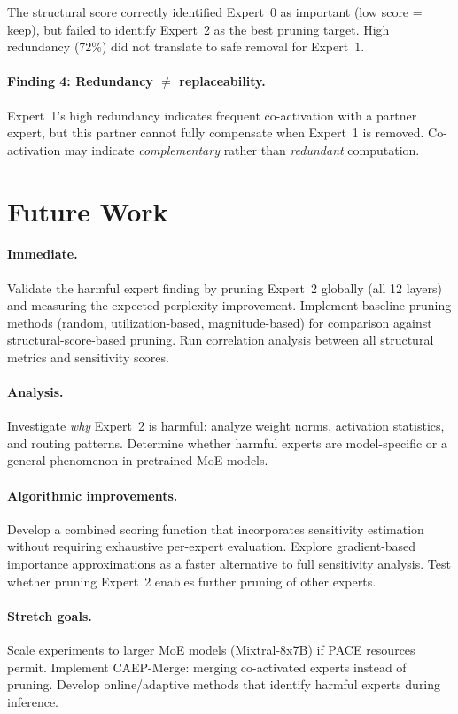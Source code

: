 \documentclass{article}
\begin{document}
The structural score correctly identified Expert~0 as important (low score = keep),
but failed to identify Expert~2 as the best pruning target.
High redundancy (72\%) did not translate to safe removal for Expert~1.

\paragraph{Finding 4: Redundancy $\neq$ replaceability.}
Expert~1's high redundancy indicates frequent co-activation with a partner expert,
but this partner cannot fully compensate when Expert~1 is removed.
Co-activation may indicate \emph{complementary} rather than \emph{redundant} computation.

\section{Future Work}

\paragraph{Immediate.}
Validate the harmful expert finding by pruning Expert~2 globally (all 12 layers)
and measuring the expected perplexity improvement.
Implement baseline pruning methods (random, utilization-based, magnitude-based)
for comparison against structural-score-based pruning.
Run correlation analysis between all structural metrics and sensitivity scores.

\paragraph{Analysis.}
Investigate \emph{why} Expert~2 is harmful: analyze weight norms, activation
statistics, and routing patterns.
Determine whether harmful experts are model-specific or a general phenomenon
in pretrained MoE models.

\paragraph{Algorithmic improvements.}
Develop a combined scoring function that incorporates sensitivity estimation
without requiring exhaustive per-expert evaluation.
Explore gradient-based importance approximations as a faster alternative to
full sensitivity analysis.
Test whether pruning Expert~2 enables further pruning of other experts.

\paragraph{Stretch goals.}
Scale experiments to larger MoE models (Mixtral-8x7B) if PACE resources permit.
Implement CAEP-Merge: merging co-activated experts instead of pruning.
Develop online/adaptive methods that identify harmful experts during inference.



\end{document}
